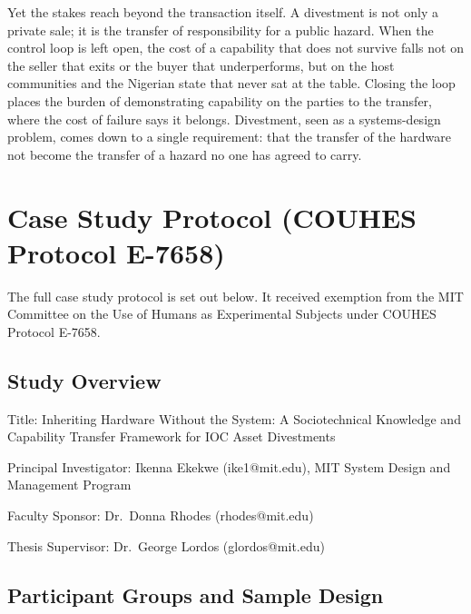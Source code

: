 \documentclass[twoside,fontset=lmodern]{mitthesis}
\makeatletter
\newcommand{\mitappnumberline}[1]{Appendix~#1:\hspace{0.6em}}
\newcommand{\mitappchapter}[2]{\begingroup\let\numberline\mitappnumberline\mitoriglchapter{#1}{#2}\endgroup}
\newcommand{\appendixtocsetup}{%
  \addvspace{1.5em}{\noindent\bfseries\color{Blue3}Appendices\par}\addvspace{0.4em}%
  \global\let\mitoriglchapter\l@chapter \global\let\l@chapter\mitappchapter
}
\makeatother
\begin{document}
Yet the stakes reach beyond the transaction itself. A divestment is not
only a private sale; it is the transfer of responsibility for a public
hazard. When the control loop is left open, the cost of a capability
that does not survive falls not on the seller that exits or the buyer
that underperforms, but on the host communities and the Nigerian state
that never sat at the table. Closing the loop places the burden of
demonstrating capability on the parties to the transfer, where the cost
of failure says it belongs. Divestment, seen as a systems-design
problem, comes down to a single requirement: that the transfer of the
hardware not become the transfer of a hazard no one has agreed to carry.

\addtocontents{toc}{\protect\appendixtocsetup}


\appendix

\hypertarget{case-study-protocol-couhes-protocol-e-7658}{%
\chapter{Case Study Protocol (COUHES Protocol
E-7658)}\label{case-study-protocol-couhes-protocol-e-7658}}

The full case study protocol is set out below. It received exemption
from the MIT Committee on the Use of Humans as Experimental Subjects
under COUHES Protocol E-7658.

\hypertarget{study-overview}{%
\section{Study Overview}\label{study-overview}}

Title: Inheriting Hardware Without the System: A Sociotechnical
Knowledge and Capability Transfer Framework for IOC Asset Divestments

Principal Investigator: Ikenna Ekekwe (ike1@mit.edu), MIT System Design
and Management Program

Faculty Sponsor: Dr.~Donna Rhodes (rhodes@mit.edu)

Thesis Supervisor: Dr.~George Lordos (glordos@mit.edu)

\hypertarget{participant-groups-and-sample-design}{%
\section{Participant Groups and Sample
Design}\label{participant-groups-and-sample-design}}
\end{document}
